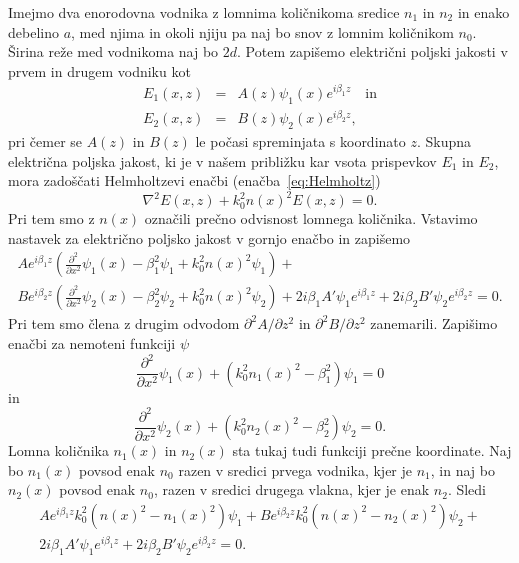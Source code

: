 Imejmo dva enorodovna vodnika z lomnima količnikoma sredice $n_1$ in $n_2$ in enako 
debelino $a$, med njima in okoli njiju pa naj bo snov z lomnim količnikom $n_0$. Širina 
reže med vodnikoma naj bo $2d$.
Potem zapišemo električni poljski jakosti v prvem in drugem vodniku kot
\begin{eqnarray}
E_1(x,z) &=& A(z) \psi_1(x) e^{i \beta_1 z} \quad \mathrm{in}\\
E_2(x,z) &=& B(z) \psi_2(x) e^{i \beta_2 z},
\label{eq:10_ampl}
\end{eqnarray}
pri čemer se $A(z)$ in $B(z)$ le počasi spreminjata s koordinato $z$. Skupna električna poljska
jakost, ki je v našem približku kar vsota prispevkov $E_1$ in $E_2$, 
mora zadoščati Helmholtzevi enačbi
(enačba~\ref{eq:Helmholtz})
\begin{equation}
\nabla^{2}E(x,z)+k_0^{2}n(x)^2 E(x,z) =0.
\end{equation}
Pri tem smo z $n(x)$ označili prečno odvisnost lomnega količnika.
Vstavimo nastavek za električno poljsko jakost v gornjo enačbo in zapišemo
\begin{multline}
A e^{i \beta_1 z}\left(\frac{\partial^2}{\partial x^2}\psi_1(x) - \beta_1^2\psi_1 + k_0^2
n(x)^2 \psi_1 \right)
+ \\
B e^{i \beta_2 z}\left(\frac{\partial^2}{\partial x^2}\psi_2(x) - \beta_2^2\psi_2 + k_0^2
n(x)^2 \psi_2 \right)+ 2 i \beta_1 A' \psi_1 e^{i \beta_1 z}+
2 i \beta_2 B' \psi_2 e^{i \beta_2 z} = 0.
\end{multline}
Pri tem smo člena z drugim odvodom $\partial^2 A/\partial z^2$ in $\partial^2 B/\partial z^2$
zanemarili. Zapišimo enačbi za nemoteni funkciji $\psi$
\begin{equation}
\frac{\partial^2}{\partial x^2}\psi_1(x) + \left(k_0^2n_1(x)^2-\beta_1^2\right) \psi_1 =0
\end{equation}
in
\begin{equation}
 \frac{\partial^2}{\partial x^2}\psi_2(x) + \left(k_0^2n_2(x)^2-\beta_2^2\right) \psi_2 =0.
\end{equation}
Lomna količnika $n_1(x)$ in $n_2(x)$ sta tukaj tudi funkciji prečne koordinate. Naj bo $n_1(x)$  
povsod enak $n_0$ razen v sredici prvega vodnika, kjer je $n_1$, in naj bo 
$n_2(x)$ povsod enak $n_0$, razen v sredici drugega vlakna, kjer je enak $n_2$. Sledi
\begin{multline}
A e^{i \beta_1 z}k_0^2\left(n(x)^2 -n_1(x)^2\right)\psi_1 
+ 
B e^{i \beta_2 z}k_0^2\left(n(x)^2 -n_2(x)^2\right)\psi_2 + \\2 i \beta_1 A' \psi_1 e^{i \beta_1 z}+
2 i \beta_2 B' \psi_2 e^{i \beta_2 z} = 0.
\end{multline}

